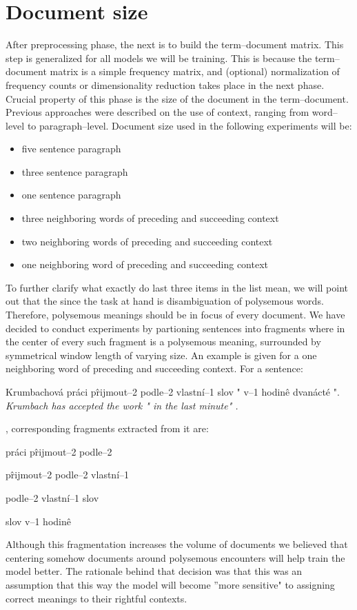 \section{Document size}
After preprocessing phase, the next is to build the term--document matrix. This step is generalized for all models we will be training. This is because the term--document matrix is a simple frequency matrix, and (optional) normalization of frequency counts or dimensionality reduction takes place in the next phase. Crucial property of this phase is the size of the document in the term--document. Previous approaches were described on the use of context, ranging from word--level to paragraph--level. Document size used in the following experiments will be: 
\begin{itemize}
\item five sentence paragraph
\item three sentence paragraph
\item one sentence paragraph
\item three neighboring words of preceding and succeeding context
\item two neighboring words of preceding and succeeding context
\item one neighboring word of preceding and succeeding context
\end{itemize}
To further clarify what exactly do last three items in the list mean, we will point out that the since the task
at hand is disambiguation of polysemous words. Therefore, polysemous meanings should be in focus of
every document. We have decided to conduct experiments by partioning sentences into fragments where 
in the center of every such fragment is a polysemous meaning, surrounded by symmetrical window 
length of varying size. An example is given for a one neighboring word of preceding and succeeding context. For a sentence:
\begin{examples}
\item Krumbachov\'a pr\'aci p\^rijmout--2 podle--2 vlastn\'i--1 slov " v--1 hodin\^e dvan\'act\'e ".
\glt \textit{  Krumbach has accepted the work " in the last minute" .}
\end{examples}
, corresponding fragments extracted from it are:
\begin{examples}
\item pr\'aci p\^rijmout--2 podle--2
\item p\^rijmout--2 podle--2 vlastn\'i--1
\item podle--2 vlastn\'i--1 slov
\item slov v--1 hodin\^e
\end{examples}
Although this fragmentation increases the volume of documents we believed that centering somehow
documents around polysemous encounters will help train the model better. The rationale behind that decision was that this was an assumption that this way the model will become ''more sensitive" to assigning  correct meanings to their rightful contexts. 

